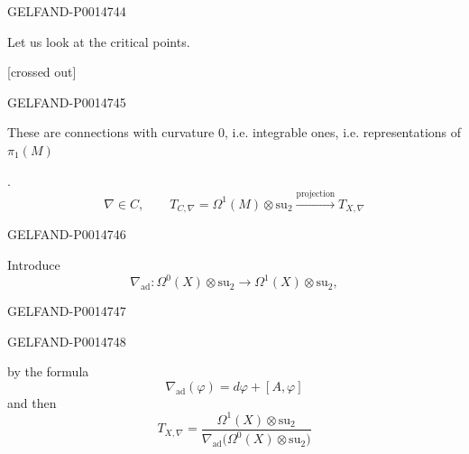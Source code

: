 \begin{GelfandAdjacentEvidence}{GELFAND-P001474}{4}


Let us look at the critical points.

[crossed out]
\end{GelfandAdjacentEvidence}
\begin{GelfandAdjacentEvidence}{GELFAND-P001474}{5}


These are connections with curvature \(0\), i.e. integrable ones, i.e. representations of \(\pi_1(M)\)

.
\begin{equation*}
\nabla\in C,\qquad
T_{C,\nabla}=\Omega^1(M)\otimes\mathrm{su}_2
\xrightarrow{\text{projection}}T_{X,\nabla}
\tag{10}
\end{equation*}
\end{GelfandAdjacentEvidence}
\begin{GelfandAdjacentEvidence}{GELFAND-P001474}{6}


Introduce
\begin{equation*}
\nabla_{\mathrm{ad}}\colon\Omega^0(X)\otimes\mathrm{su}_2
\longrightarrow\Omega^1(X)\otimes\mathrm{su}_2,
\tag{11?}
\end{equation*}
\end{GelfandAdjacentEvidence}
\begin{GelfandAdjacentEvidence}{GELFAND-P001474}{7}

\end{GelfandAdjacentEvidence}
\begin{GelfandAdjacentEvidence}{GELFAND-P001474}{8}


by the formula
\begin{equation*}
\nabla_{\mathrm{ad}}(\varphi)=d\varphi+[A,\varphi]
\tag{12}
\end{equation*}
and then
\begin{equation*}
T_{X,\nabla}=\frac{\Omega^1(X)\otimes\mathrm{su}_2}
{\nabla_{\mathrm{ad}}\bigl(\Omega^0(X)\otimes\mathrm{su}_2\bigr)}
\tag{13}
\end{equation*}
\end{GelfandAdjacentEvidence}


